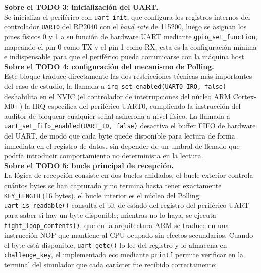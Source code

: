 \documentclass[12pt,letterpaper]{article}
\begin{document}
\textbf{Sobre el TODO 3: inicialización del UART.}\\
Se inicializa el periférico con \texttt{uart\_init}, que configura los registros internos del controlador
\texttt{UART0} del RP2040 con el \textit{baud rate} de 115200, luego se asignan los pines físicos 0 y 1 a
su función de hardware UART mediante \texttt{gpio\_set\_function}, mapeando el pin 0 como TX y el pin 1 como RX,
esta es la configuración mínima e indispensable para que el periférico pueda comunicarse con la máquina host.\\

\textbf{Sobre el TODO 4: configuración del mecanismo de Polling.}\\
Este bloque traduce directamente las dos restricciones técnicas más importantes del caso de estudio, la llamada
a \texttt{irq\_set\_enabled(UART0\_IRQ, false)} deshabilita en el NVIC (el controlador de interrupciones del
núcleo ARM Cortex-M0+) la IRQ específica del periférico UART0, cumpliendo la instrucción del auditor de bloquear
cualquier señal asíncrona a nivel físico. La llamada a \texttt{uart\_set\_fifo\_enabled(UART\_ID, false)}
desactiva el buffer FIFO de hardware del UART, de modo que cada byte quede disponible para lectura de forma
inmediata en el registro de datos, sin depender de un umbral de llenado que podría introducir comportamiento no
determinista en la lectura.\\

\textbf{Sobre el TODO 5: bucle principal de recepción.}\\
La lógica de recepción consiste en dos bucles anidados, el bucle exterior controla cuántos bytes se han
capturado y no termina hasta tener exactamente \texttt{KEY\_LENGTH} (16 bytes), el bucle interior es el núcleo
del Polling: \texttt{uart\_is\_readable()} consulta el bit de estado del registro del periférico UART para saber
si hay un byte disponible; mientras no lo haya, se ejecuta \texttt{tight\_loop\_contents()}, que en la
arquitectura ARM se traduce en una instrucción NOP que mantiene al CPU ocupado sin efectos secundarios.
Cuando el byte está disponible, \texttt{uart\_getc()} lo lee del registro y lo almacena en
\texttt{challenge\_key}, el implementado eco mediante \texttt{printf} permite verificar en la terminal del
simulador que cada carácter fue recibido correctamente:

\bigskip
\bigskip
\end{document}
